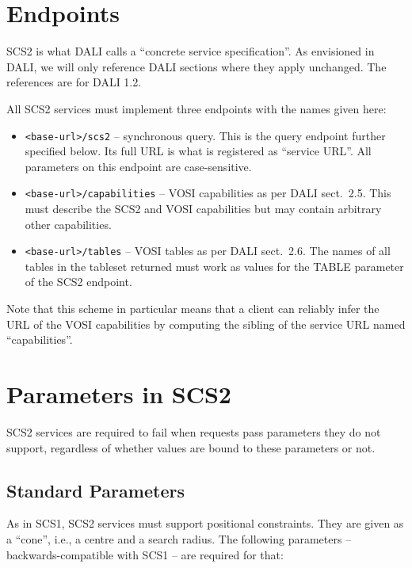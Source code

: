 \documentclass[11pt,a4paper]{ivoa}
\begin{document}
\section{Endpoints}

SCS2 is what DALI \citep{2017ivoa.spec.0517D} calls a ``concrete service
specification''.  As envisioned in DALI, we will only reference DALI
sections where they apply unchanged.  The references are for DALI 1.2.

All SCS2 services must implement three endpoints with the names given
here:

\begin{itemize}
\item \verb|<base-url>/scs2| -- synchronous query.  This is the query
endpoint further specified below.  Its full URL is what is registered as
``service URL''.  All parameters on this endpoint are case-sensitive.

\item \verb|<base-url>/capabilities| -- VOSI capabilities as per DALI
sect.~2.5.  This must describe the SCS2 and VOSI capabilities but may
contain arbitrary other capabilities.

\item \verb|<base-url>/tables| -- VOSI tables as per DALI sect.~2.6.
The names of all tables in the tableset returned must work as values for
the TABLE parameter of the SCS2 endpoint.
\end{itemize}

Note that this scheme in particular means that a client can reliably
infer the URL of the VOSI capabilities by computing the sibling of the
service URL named ``capabilities''.

\section{Parameters in SCS2}

SCS2 services are required to fail when requests pass parameters they do
not support, regardless of whether values are bound to these parameters
or not.

\subsection{Standard Parameters}

As in SCS1, SCS2 services must support positional constraints.  They are
given as a ``cone'', i.e., a centre and a search radius.  The following
parameters -- backwards-compatible with SCS1 -- are required for that:
\end{document}
